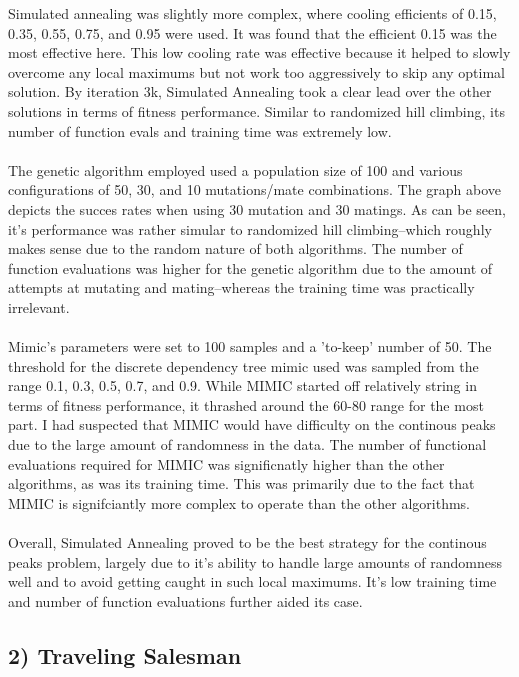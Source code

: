 \documentclass[h]{article}
\begin{document}
Simulated annealing was slightly more complex, where cooling efficients of 0.15, 
0.35, 0.55, 0.75, and 0.95 were used.  It was found that the efficient 0.15 was 
the most effective here.  This low cooling rate was effective because it helped to slowly overcome any local
 maximums but not work too aggressively to skip any optimal solution.  By 
 iteration 3k, Simulated Annealing took a clear lead over the other solutions in 
 terms of fitness performance.  Similar to randomized hill climbing, its number 
 of function evals and training time was extremely low.
\\ \\
The genetic algorithm employed used a population size of 100 and various 
configurations of 50, 30, and 10 mutations/mate combinations.  The graph above 
depicts the succes rates when using 30 mutation and 30 matings.  As can be seen, 
it's performance was rather simular to randomized hill climbing--which roughly 
makes sense due to the random nature of both algorithms.  The number of function 
evaluations was higher for the genetic algorithm due to the amount of attempts 
at mutating and mating--whereas the training time was practically irrelevant.
\\ \\
Mimic's parameters were set to 100 samples and a 'to-keep' number of 50.  
The threshold for the discrete dependency tree mimic used was sampled from the 
range 0.1, 0.3, 0.5, 0.7, and 0.9.  While MIMIC started off relatively string in 
terms of fitness performance, it thrashed around the 60-80 range for the most 
part.  I had suspected that MIMIC would have difficulty on the continous peaks 
due to the large amount of randomness in the data.  The number of functional 
evaluations required for MIMIC was significnatly higher than the other 
algorithms, as was its training time.  This was primarily due to the fact that 
MIMIC is signifciantly more complex to operate than the other algorithms.
\\ \\
Overall, Simulated Annealing proved to be the best strategy for the continous 
peaks problem, largely due to it's ability to handle large amounts of randomness 
well and to avoid getting caught in such local maximums.  It's low training time 
and number of function evaluations further aided its case.


\subsection*{2) Traveling Salesman}  
\end{document}
